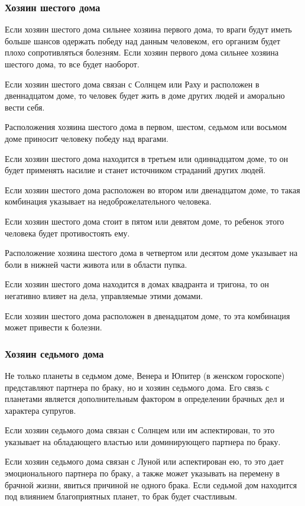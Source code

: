 \subsubsection*{Хозяин шестого дома}

Если хозяин шестого дома сильнее хозяина первого дома, то враги будут иметь больше шансов одержать победу над данным человеком, его организм будет плохо сопротивляться болезням. Если хозяин первого дома сильнее хозяина шестого дома, то все будет наоборот.

Если хозяин шестого дома связан с Солнцем или Раху и расположен в двеннадцатом доме, то человек будет жить в доме других людей и аморально вести себя.

Расположения хозяина шестого дома в первом, шестом, седьмом или восьмом доме приносит человеку победу над врагами.

Если хозяин шестого дома находится в третьем или одиннадцатом доме, то он будет применять насилие и станет источником страданий других людей.

Если хозяин шестого дома расположен во втором или двенадцатом доме, то такая комбинация указывает на недоброжелательного человека.

Если хозяин шестого дома стоит в пятом или девятом доме, то ребенок этого человека будет противостоять ему.

Расположение хозяина шестого дома в четвертом или десятом доме указывает на боли в нижней части живота или в области пупка.

Если хозяин шестого дома находится в домах квадранта и тригона, то он негативно влияет на дела, управляемые этими домами.

Если хозяин шестого дома расположен в двенадцатом доме, то эта комбинация может привести к болезни.


\subsubsection*{Хозяин седьмого дома}
Не только планеты в седьмом доме, Венера и Юпитер (в женском гороскопе) представляют партнера по браку, но и хозяин седьмого дома. Его связь с планетами является дополнительным фактором в определении брачных дел и характера супругов.

Если хозяин седьмого дома связан с Солнцем или им аспектирован, то это указывает на обладающего властью или доминирующего партнера по браку.

Если хозяин седьмого дома связан с Луной или аспектирован ею, то это дает эмоционального партнера по браку, а также может указывать на перемену в брачной жизни, явиться причиной не одного брака. Если седьмой дом находится под влиянием благоприятных планет, то брак будет счастливым.

